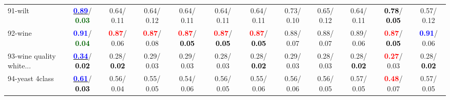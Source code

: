 \begin{table}[h]
\begin{center}
{\begin{tabular}{lc|c|c|c|c|c|c|c|c|c|c}
91-wilt & \underline{\textcolor{blue}{\textbf{  0.89}}}/\textcolor{darkgreen}{\textbf{  0.03}} &   0.64/  0.11 &   0.64/  0.12 &   0.64/  0.11 &   0.64/  0.11 &   0.64/  0.11 &   0.73/  0.10 &   0.65/  0.12 &   0.64/  0.11 & \textcolor{black}{\textbf{  0.78}}/\textcolor{black}{\textbf{  0.05}} &   0.57/  0.12 \\
92-wine & \textcolor{blue}{\textbf{  0.91}}/\textcolor{darkgreen}{\textbf{  0.04}} & \textcolor{red}{\textbf{  0.87}}/  0.06 & \textcolor{red}{\textbf{  0.87}}/  0.08 & \textcolor{red}{\textbf{  0.87}}/\textcolor{black}{\textbf{  0.05}} & \textcolor{red}{\textbf{  0.87}}/\textcolor{black}{\textbf{  0.05}} & \textcolor{red}{\textbf{  0.87}}/\textcolor{black}{\textbf{  0.05}} &   0.88/  0.07 &   0.88/  0.07 &   0.89/  0.06 & \textcolor{red}{\textbf{  0.87}}/\textcolor{black}{\textbf{  0.05}} & \textcolor{blue}{\textbf{  0.91}}/  0.06 \\ \hline
93-wine quality white... & \underline{\textcolor{blue}{\textbf{  0.34}}}/\textcolor{black}{\textbf{  0.02}} &   0.28/\textcolor{black}{\textbf{  0.02}} &   0.29/  0.03 &   0.29/  0.03 &   0.28/  0.03 &   0.28/\textcolor{black}{\textbf{  0.02}} &   0.29/  0.03 &   0.28/  0.03 &   0.28/\textcolor{black}{\textbf{  0.02}} & \textcolor{red}{\textbf{  0.27}}/  0.03 &   0.28/\textcolor{black}{\textbf{  0.02}} \\
94-yeast 4class & \underline{\textcolor{blue}{\textbf{  0.61}}}/\textcolor{black}{\textbf{  0.03}} &   0.56/  0.04 &   0.55/  0.05 &   0.54/  0.06 &   0.56/  0.05 &   0.55/  0.06 &   0.56/  0.06 &   0.56/  0.05 &   0.57/  0.05 & \textcolor{red}{\textbf{  0.48}}/  0.07 &   0.57/  0.05 \\\end{tabular}}\label{stratsBalAcc2aC4.5}
\end{center}
\end{table}
